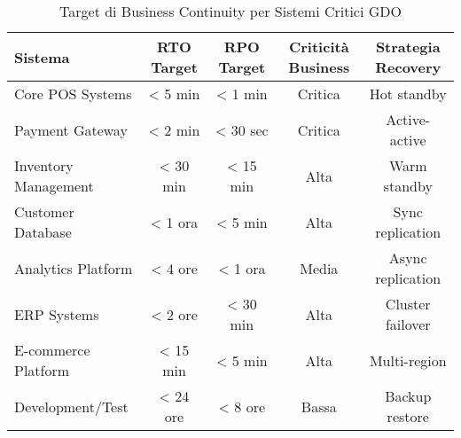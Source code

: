 \documentclass[12pt,a4paper]{article}
\begin{document}

\begin{table}[htbp]
\centering
\caption{Target di Business Continuity per Sistemi Critici GDO}
\label{tab:business_continuity_targets}
\begin{tabular}{@{}lcccc@{}}
\toprule
\textbf{Sistema} & \textbf{RTO Target} & \textbf{RPO Target} & \textbf{Criticità Business} & \textbf{Strategia Recovery} \\
\midrule
Core POS Systems & < 5 min & < 1 min & Critica & Hot standby \\
\addlinespace
Payment Gateway & < 2 min & < 30 sec & Critica & Active-active \\
\addlinespace
Inventory Management & < 30 min & < 15 min & Alta & Warm standby \\
\addlinespace
Customer Database & < 1 ora & < 5 min & Alta & Sync replication \\
\addlinespace
Analytics Platform & < 4 ore & < 1 ora & Media & Async replication \\
\addlinespace
ERP Systems & < 2 ore & < 30 min & Alta & Cluster failover \\
\addlinespace
E-commerce Platform & < 15 min & < 5 min & Alta & Multi-region \\
\addlinespace
Development/Test & < 24 ore & < 8 ore & Bassa & Backup restore \\
\bottomrule
\end{tabular}
\end{table}
\end{document}
